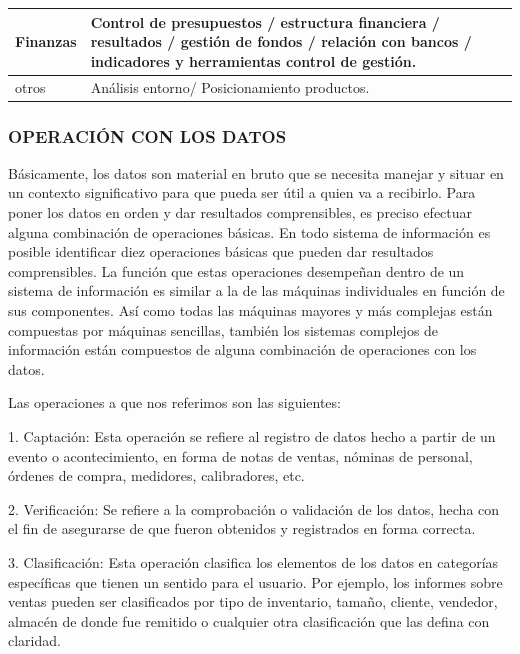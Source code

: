 
\begin{center}
\small
\begin{tabular}{|p{}|p{}|}
\hline
Finanzas & Control de presupuestos / estructura financiera / resultados / gestión de fondos / relación con bancos / indicadores y herramientas control de gestión. \\ \hline
otros & Análisis entorno/ Posicionamiento productos. \\ \hline
\end{tabular}
\end{center}

\subsubsection*{OPERACIÓN CON LOS DATOS}
Básicamente, los datos son material en bruto que se necesita manejar y situar en un contexto significativo para que pueda ser útil a quien va a recibirlo. Para poner los datos en orden y dar resultados comprensibles, es preciso efectuar alguna combinación de operaciones básicas. En todo sistema de información es posible identificar diez operaciones básicas que pueden dar resultados comprensibles. La función que estas operaciones desempeñan dentro de un sistema de información es similar a la de las máquinas individuales en función de sus componentes. Así como todas las máquinas mayores y más complejas están compuestas por máquinas sencillas, también los sistemas complejos de información están compuestos de alguna combinación de operaciones con los datos.

Las operaciones a que nos referimos son las siguientes:

1. Captación: Esta operación se refiere al registro de datos hecho a partir de un evento o acontecimiento, en forma de notas de ventas, nóminas de personal, órdenes de compra, medidores, calibradores, etc.

2. Verificación: Se refiere a la comprobación o validación de los datos, hecha con el fin de asegurarse de que fueron obtenidos y registrados en forma correcta.

3. Clasificación: Esta operación clasifica los elementos de los datos en categorías específicas que tienen un sentido para el usuario. Por ejemplo, los informes sobre ventas pueden ser clasificados por tipo de inventario, tamaño, cliente, vendedor, almacén de donde fue remitido o cualquier otra clasificación que las defina con claridad.

